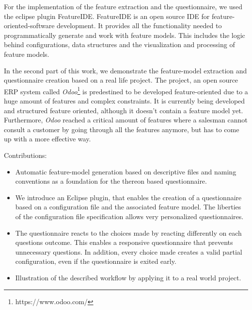 For the implementation of the feature extraction and the questionnaire, we used the eclipse plugin FeatureIDE. FeatureIDE is an open source IDE for feature-oriented-software development. It provides all the functionality needed to programmatically generate and work with feature models. This includes the logic behind configurations, data structures and the visualization and processing of feature models.

In the second part of this work, we demonstrate the feature-model extraction and questionnaire creation based on a real life project. The project, an open source ERP system called \textit{Odoo}\footnote{https://www.odoo.com/} is predestined to be developed feature-oriented due to a huge amount of features and complex constraints. It is currently being developed and structured feature oriented, although it doesn't contain a feature model yet. Furthermore, \textit{Odoo} reached a critical amount of features where a salesman cannot consult a customer by going through all the features anymore, but has to come up with a more effective way.

Contributions:
\begin{itemize}
\item Automatic feature-model generation based on descriptive files and naming conventions as a foundation for the thereon based questionnaire.
\item We introduce an Eclipse plugin, that enables the creation of a questionnaire based on a configuration file and the associated feature model. The liberties of the configuration file specification allows very personalized questionnaires.
\item The questionnaire reacts to the choices made by reacting differently on each questions outcome. This enables a responsive questionnaire that prevents unnecessary questions. In addition, every choice made creates a valid partial configuration, even if the questionnaire is exited early.
\item Illustration of the described workflow by applying it to a real world project.
\end{itemize}